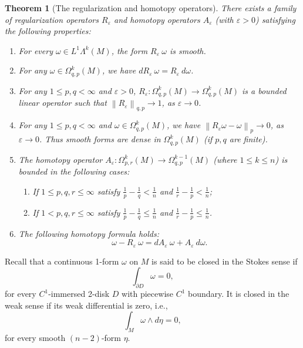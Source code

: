 \documentclass[11pt,letterpaper,reqno,abstract=true]{scrartcl}
\theoremstyle{plain}                              %
\newtheorem{thm}{Theorem}[section]
\theoremstyle{definition}                         %
\theoremstyle{remark}                             %
\newcommand{\veps}{\varepsilon}
\newcommand{\del}{\partial}
\providecommand{\norm}[1]{\left\lVert#1\right\rVert}       %
\begin{document}
\begin{thm}[The regularization and homotopy operators]    \label{thm:goldshtein+troyanov}
  There exists a family of regularization operators $R_\veps$ and
  homotopy operators $A_\veps$ (with $\veps > 0$) satisfying the following properties:
  
  \begin{enumerate}
  \item[(a)] For every $\omega \in L^1 \Lambda^k(M)$, the form
    $R_\veps \: \omega$ is smooth.
  \item[(b)] For any $\omega \in \Omega^k_{q,p}(M)$, we have $d R_\veps
    \: \omega = R_\veps \: d\omega$.
  \item[(c)] For any $1 \leq p, q < \infty$ and $\veps > 0$, $R_\veps
    : \Omega^k_{q,p}(M) \to \Omega^k_{q,p}(M)$ is a bounded linear operator
    such that $\norm{R_\veps}_{q,p} \to 1$, as $\veps \to 0$.
  \item[(d)] For any $1 \leq p, q < \infty$ and $\omega \in
    \Omega^k_{q,p}(M)$, we have $\norm{R_\veps \omega - \omega}_p \to
    0$, as $\veps \to 0$. Thus smooth forms are dense in
    $\Omega^k_{q,p}(M)$ (if $p, q$ are finite).
  \item[(e)] The homotopy operator $A_\veps : \Omega^k_{p,r}(M) \to
    \Omega^{k-1}_{q,p}(M)$ (where $1 \leq k \leq n$) is bounded in the
    following cases:
    \begin{enumerate}
    \item[(i)] If $1 \leq p, q, r \leq \infty$ satisfy $\frac{1}{p} -
      \frac{1}{q} < \frac{1}{n}$ and $\frac{1}{r} - \frac{1}{p} <
      \frac{1}{n}$;

    \item[(ii)] If $1 < p, q, r \leq \infty$ satisfy $\frac{1}{p} - \frac{1}{q}
      \leq \frac{1}{n}$ and $\frac{1}{r} - \frac{1}{p} \leq \frac{1}{n}$.
    \end{enumerate}

  \item[(f)] The following homotopy formula holds:
    \begin{displaymath}
      \omega - R_\veps \: \omega = d A_\veps \: \omega + A_\veps\: d \omega.
    \end{displaymath}
  \end{enumerate}
\end{thm}

Recall that a continuous 1-form $\omega$ on $M$ is said to be closed
in the \textsf{Stokes sense} if
%
  \begin{displaymath}
    \int_{\del D} \omega = 0,
  \end{displaymath}
  for every $C^1$-immersed 2-disk $D$ with piecewise $C^1$
  boundary. It is closed in the \textsf{weak sense} if its weak
  differential is zero, i.e.,
  \begin{displaymath}
    \int_M \omega \wedge d\eta = 0,
  \end{displaymath}
  for every smooth $(n-2)$-form $\eta$.
\end{document}
